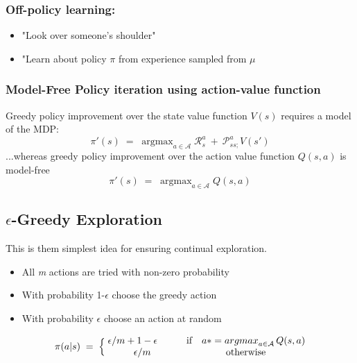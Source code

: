 \documentclass[10pt]{article}
\begin{document}
\subsubsection*{Off-policy learning:}
\begin{itemize}
\item "Look over someone's shoulder"
\item "Learn about policy $\pi$ from experience sampled from $\mu$
\end{itemize}

\subsubsection*{Model-Free Policy iteration using action-value function}

Greedy policy improvement over the state value function $V(s)$ requires a model of the MDP:
\begin{equation}
\pi'(s) \; = \; \mathop{argmax}_{a \in \mathcal{A}} \mathcal{R}_{s}^{a} \: + \: \mathcal{P}_{ss;}^{a} V(s')
\end{equation}
...whereas greedy policy improvement over the action value function $Q(s,a)$ is model-free
\begin{equation}
\pi'(s) \; = \; \mathop{argmax}_{a \in \mathcal{A}} Q(s,a)
\end{equation}

\subsection{$\epsilon$-Greedy Exploration}
This is them simplest idea for ensuring continual exploration.
\begin{itemize}
\item All \textit{m} actions are tried with non-zero probability
\item With probability 1-$\epsilon$ choose the greedy action
\item With probability $\epsilon$ choose an action at random 
\end{itemize}

\begin{equation}
\pi(a|s)\; = \; \Big\{ \; \begin{matrix} \epsilon/m+1-\epsilon \qquad & $if$ \quad a* = \mathop{argmax}_{a \in \mathcal{A}} Q(s, a) \\
\epsilon / m & $otherwise$ \\\end{matrix} 
\end{equation}
\end{document}
